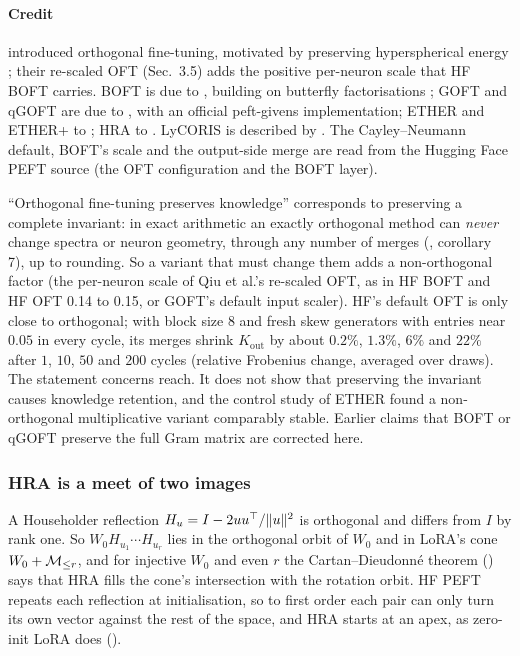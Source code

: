 \paragraph{Credit}
\citet{qiu2023controlling} introduced orthogonal fine-tuning, motivated by preserving hyperspherical energy
\citep{liu2018learning}; their re-scaled OFT (Sec.~3.5) adds the positive per-neuron scale that HF BOFT carries. BOFT is
due to \citet{liu2023parameter}, building on butterfly factorisations \citep{dao2019learning}; GOFT and qGOFT are due to
\citet{ma2024parameter}, with an official peft-givens implementation; ETHER and ETHER+ to \citet{bini2024ether}; HRA to
\citet{yuan2024bridging}. LyCORIS is described by \citet{yeh2023navigating}. The Cayley--Neumann default, BOFT's scale
and the output-side merge are read from the Hugging Face PEFT source \citep{xmangrulkar2022peft} (the OFT configuration
and the BOFT layer).

\begin{explains}
``Orthogonal fine-tuning preserves knowledge'' corresponds to preserving a complete invariant: in exact arithmetic an
exactly orthogonal method can \emph{never} change spectra or neuron geometry, through any number of merges
(, corollary 7), up to rounding. So a variant that must change them adds a non-orthogonal factor
(the per-neuron scale of Qiu et al.'s re-scaled OFT, as in HF BOFT and HF OFT 0.14 to 0.15, or GOFT's default input
scaler). HF's default OFT is only close to orthogonal; with block size $8$ and fresh skew generators with entries near $0.05$ in
every cycle, its merges shrink $K_{\mathrm{out}}$ by about $0.2\%$, $1.3\%$, $6\%$ and $22\%$ after $1$, $10$, $50$ and
$200$ cycles (relative Frobenius change, averaged over draws). The statement
concerns reach. It does not show that preserving the invariant causes knowledge retention, and the control study of
ETHER \citep{bini2024ether} found a non-orthogonal multiplicative variant comparably stable. Earlier claims that BOFT or
qGOFT preserve the full Gram matrix are corrected here.
\end{explains}

\subsubsection{HRA is a meet of two images}\label{sec:erlangen-hra}

A Householder reflection $H_u=I-2uu^{\top}/\lVert u\rVert^2$ is orthogonal and differs from $I$ by rank one. So
$W_0H_{u_1}\cdots H_{u_r}$ lies in the orthogonal orbit of $W_0$ and in LoRA's cone $W_0+\mathcal{M}_{\le r}$, and for injective $W_0$
and even $r$ the Cartan--Dieudonn\'e theorem () says that HRA fills the cone's intersection with the
rotation orbit. HF PEFT repeats each reflection at initialisation, so to first order each pair can only turn its own
vector against the rest of the space, and HRA starts at an apex, as zero-init LoRA does ().


